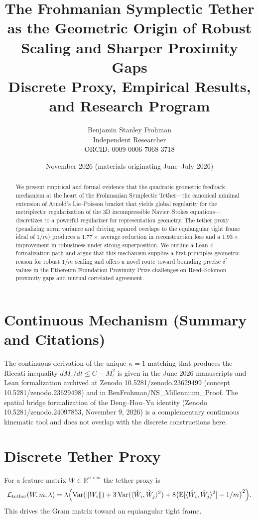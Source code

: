 \documentclass{article}
\title{The Frohmanian Symplectic Tether as the Geometric Origin of Robust Scaling and Sharper Proximity Gaps\\ Discrete Proxy, Empirical Results, and Research Program}
\author{Benjamin Stanley Frohman\\ Independent Researcher\\ ORCID: 0009-0006-7068-3718}
\date{November 2026 (materials originating June--July 2026)}
\begin{document}
\maketitle
{}\par


\begin{abstract}
We present empirical and formal evidence that the quadratic geometric feedback mechanism at the heart of the Frohmanian Symplectic Tether---the canonical minimal extension of Arnold's Lie--Poisson bracket that yields global regularity for the metriplectic regularization of the 3D incompressible Navier--Stokes equations---discretizes to a powerful regularizer for representation geometry. The tether proxy (penalizing norm variance and driving squared overlaps to the equiangular tight frame ideal of $1/m$) produces a $1.77\times$ average reduction in reconstruction loss and a $1.93\times$ improvement in robustness under strong superposition. We outline a Lean 4 formalization path and argue that this mechanism supplies a first-principles geometric reason for robust $1/m$ scaling and offers a novel route toward bounding precise $\delta^*$ values in the Ethereum Foundation Proximity Prize challenges on Reed--Solomon proximity gaps and mutual correlated agreement.
\end{abstract}

\section{Continuous Mechanism (Summary and Citations)}
The continuous derivation of the unique $\kappa=1$ matching that produces the Riccati inequality $dM_\varepsilon/dt \le C - M_\varepsilon^2$ is given in the June 2026 manuscripts and Lean formalization archived at Zenodo 10.5281/zenodo.23629499 (concept 10.5281/zenodo.23629498) and in BenFrohman/NS\_Millennium\_Proof. The spatial bridge formalization of the Deng--Hou--Yu identity (Zenodo 10.5281/zenodo.24097853, November 9, 2026) is a complementary continuous kinematic tool and does not overlap with the discrete constructions here.

\section{Discrete Tether Proxy}
For a feature matrix $W\in\mathbb{R}^{n\times m}$ the tether proxy is
\[
\mathcal{L}_{\rm tether}(W,m,\lambda)=\lambda\Bigl(\operatorname{Var}(\|W_i\|)+3\operatorname{Var}(\langle\hat W_i,\hat W_j\rangle^2)+8\bigl(\mathbb{E}[\langle\hat W_i,\hat W_j\rangle^2]-1/m\bigr)^2\Bigr).
\]
This drives the Gram matrix toward an equiangular tight frame.
\end{document}
